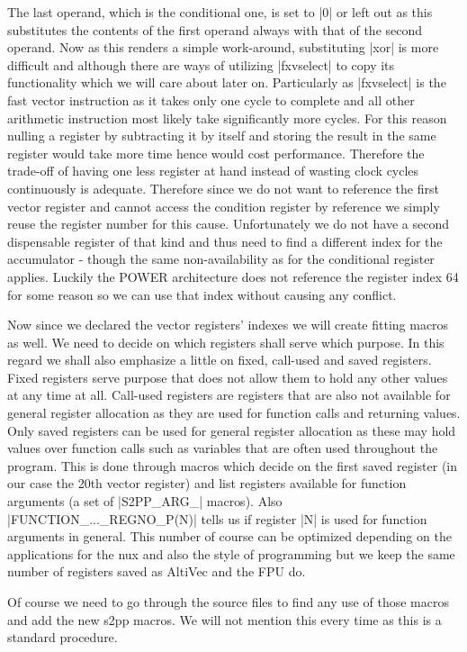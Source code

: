 The last operand, which is the conditional one, is set to |0| or left out as this substitutes the contents of the first operand always with that of the second operand.
Now as this renders a simple work-around, substituting |xor| is more difficult and although there are ways of utilizing |fxvselect| to copy its functionality  which we will care about later on.
Particularly as |fxvselect| is the fast vector instruction as it takes only one cycle to complete and all other arithmetic instruction most likely take significantly more cycles.
For this reason nulling a register by subtracting it by itself and storing the result in the same register would take more time hence would cost performance.
Therefore the trade-off of having one less register at hand instead of wasting clock cycles continuously is adequate.
Therefore since we do not want to reference the first vector register and cannot access the condition register by reference we simply reuse the register number for this cause.
Unfortunately we do not have a second dispensable register of that kind and thus need to find a different index for the accumulator - though the same non-availability as for the conditional register applies.
Luckily the POWER architecture does not reference the register index 64 for some reason so we can use that index without causing any conflict.

Now since we declared the vector registers' indexes we will create fitting macros as well.
We need to decide on which registers shall serve which purpose.
In this regard we shall also emphasize a little on fixed, call-used and saved registers.
Fixed registers serve purpose that does not allow them to hold any other values at any time at all.
Call-used registers are registers that are also not available for general register allocation as they are used for function calls and returning values.
Only saved registers can be used for general register allocation as these may hold values over function calls such as variables that are often used throughout the program.
This is done through macros which decide on the first saved register (in our case the 20th vector register) and list registers available for function arguments (a set of |S2PP_ARG_| macros).
Also |FUNCTION_..._REGNO_P(N)| tells us if register |N| is used for function arguments in general.
This number of course can be optimized depending on the applications for the nux and also the style of programming but we keep the same number of registers saved as AltiVec and the FPU do.

Of course we need to go through the source files to find any use of those macros and add the new s2pp macros.
We will not mention this every time as this is a standard procedure.

